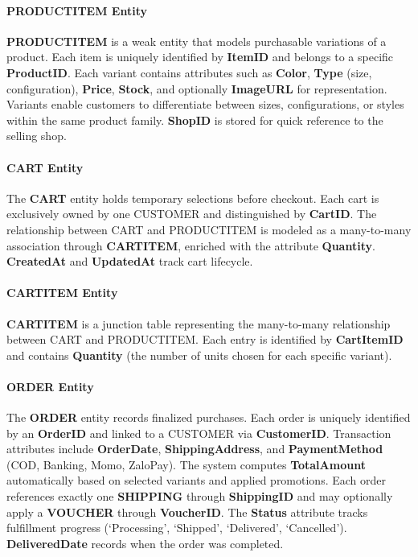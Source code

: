 \paragraph{PRODUCTITEM Entity}

\textbf{PRODUCTITEM} is a weak entity that models purchasable variations of a product. Each item is uniquely identified by \textbf{ItemID} and belongs to a specific \textbf{ProductID}. Each variant contains attributes such as \textbf{Color}, \textbf{Type} (size, configuration), \textbf{Price}, \textbf{Stock}, and optionally \textbf{ImageURL} for representation. Variants enable customers to differentiate between sizes, configurations, or styles within the same product family. \textbf{ShopID} is stored for quick reference to the selling shop.

\paragraph{CART Entity}

The \textbf{CART} entity holds temporary selections before checkout. Each cart is exclusively owned by one CUSTOMER and distinguished by \textbf{CartID}. The relationship between CART and PRODUCTITEM is modeled as a many-to-many association through \textbf{CARTITEM}, enriched with the attribute \textbf{Quantity}. \textbf{CreatedAt} and \textbf{UpdatedAt} track cart lifecycle.

\paragraph{CARTITEM Entity}

\textbf{CARTITEM} is a junction table representing the many-to-many relationship between CART and PRODUCTITEM. Each entry is identified by \textbf{CartItemID} and contains \textbf{Quantity} (the number of units chosen for each specific variant).

\paragraph{ORDER Entity}
The \textbf{ORDER} entity records finalized purchases. Each order is uniquely identified by an \textbf{OrderID} and linked to a CUSTOMER via \textbf{CustomerID}. Transaction attributes include \textbf{OrderDate}, \textbf{ShippingAddress}, and \textbf{PaymentMethod} (COD, Banking, Momo, ZaloPay). The system computes \textbf{TotalAmount} automatically based on selected variants and applied promotions. Each order references exactly one \textbf{SHIPPING} through \textbf{ShippingID} and may optionally apply a \textbf{VOUCHER} through \textbf{VoucherID}. The \textbf{Status} attribute tracks fulfillment progress (`Processing', `Shipped', `Delivered', `Cancelled'). \textbf{DeliveredDate} records when the order was completed.

